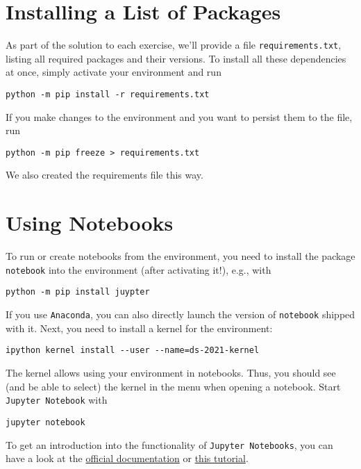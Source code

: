 \documentclass[12pt]{article}
\newcommand{\code}[1]{{\color{kitgreen}\texttt{#1}}}
\begin{document}
\section{Installing a List of Packages}

As part of the solution to each exercise, we'll provide a file \code{requirements.txt}, listing all required packages and their versions.
To install all these dependencies at once, simply activate your environment and run
%
\begin{lstlisting}[style=cmdblock]
python -m pip install -r requirements.txt
\end{lstlisting}
%
If you make changes to the environment and you want to persist them to the file, run
%
\begin{lstlisting}[style=cmdblock]
python -m pip freeze > requirements.txt
\end{lstlisting}
%
We also created the requirements file this way.

\section{Using Notebooks}
\label{sec:notebooks}

To run or create notebooks from the environment, you need to install the package \code{notebook} into the environment (after activating it!), e.g., with
%
\begin{lstlisting}[style=cmdblock]
python -m pip install juypter
\end{lstlisting}
%
If you use \code{Anaconda}, you can also directly launch the version of \code{notebook} shipped with it.
Next, you need to install a kernel for the environment:
%
\begin{lstlisting}[style=cmdblock]
ipython kernel install --user --name=ds-2021-kernel
\end{lstlisting}
%
The kernel allows using your environment in notebooks.
Thus, you should see (and be able to select) the kernel in the menu when opening a notebook.
Start \code{Jupyter Notebook} with
%
\begin{lstlisting}[style=cmdblock]
jupyter notebook
\end{lstlisting}
%
To get an introduction into the functionality of \code{Jupyter Notebooks}, you can have a look at the \href{https://jupyter-notebook.readthedocs.io/en/stable/notebook.html#}{official documentation} or \href{https://realpython.com/jupyter-notebook-introduction/}{this tutorial}.
\end{document}
